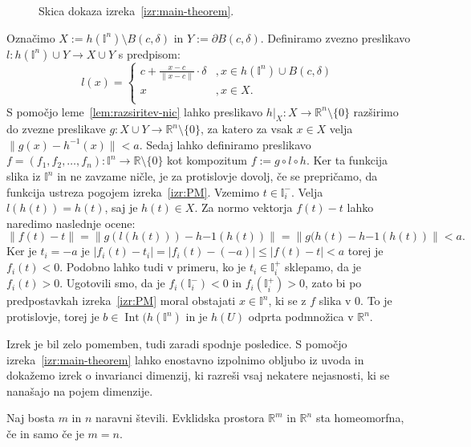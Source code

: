 \documentclass[mat1]{fmfdelo}
\newcommand{\R}{\mathbb R}
\DeclareMathOperator{\Int}{Int}
\newcommand{\I}{\mathbb I}
\newcommand{\0}{\underline{0}}
\begin{document}
\begin{dokaz}
\begin{figure}[h!]
	\caption{Skica dokaza izreka~\ref{izr:main-theorem}.}
\end{figure}

Označimo $X := h(\I^n) \setminus B(c, \delta)$ in $Y := \partial B(c, \delta)$. Definiramo zvezno preslikavo $l : h(\I^n) \cup Y \to X \cup Y$ s predpisom:
\[  l(x) = \left\{
\begin{array}{ll}
	c + \frac{x - c}{\| x - c \|} \cdot \delta &, x \in h(\I^n) \cup B(c, \delta) \\
	x &, x \in X. \\
\end{array} 
\right. \]
S pomočjo leme~\ref{lem:razsiritev-nic} lahko preslikavo $h|_X : X \to \R^n \setminus \{ 0 \}$ razširimo do zvezne preslikave $g : X \cup Y \to \R^n \setminus \{ 0 \}$, za katero za vsak $x \in X$ velja $\| g(x) - h^{-1}(x) \| < a$.
Sedaj lahko definiramo preslikavo $f = (f_1, f_2, \dots, f_n) : \I^n \to \R \setminus \{ 0 \}$ kot kompozitum $f := g \circ l \circ h$. Ker ta funkcija slika iz $\I^n$ in ne zavzame ničle, je za protislovje dovolj, če se prepričamo, da funkcija ustreza pogojem izreka~\ref{izr:PM}. Vzemimo $t \in \I_i^-$. Velja $l(h(t)) = h(t)$, saj je $h(t) \in X$. Za normo vektorja $f(t) - t$ lahko naredimo naslednje ocene:
$$\| f(t) - t \| = \| g(l(h(t))) - h{-1}(h(t)) \| = \| g(h(t) - h{-1}(h(t)) \| < a.$$ 
Ker je $t_i = - a$ je $| f_i (t) - t_i | = | f_i (t) - ( - a) | \leq | f (t) - t | < a$ torej je $f_i(t) < 0$. Podobno lahko tudi v primeru, ko je $t_i \in \I_i^+$  sklepamo, da je $f_i(t) > 0$. Ugotovili smo, da je  $f_i(\I_i^-) < 0$ in $f_i(\I_i^+) > 0$, zato bi po predpostavkah izreka~\ref{izr:PM} moral obstajati $x \in \I^n$, ki se z $f$ slika v $0$. To je protislovje, torej je $b \in \Int (h(\I^n)$ in je $h(U)$ odprta podmnožica v $\R^n$.
\end{dokaz}
Izrek je bil zelo pomemben, tudi zaradi spodnje posledice.
S pomočjo izreka~\ref{izr:main-theorem} lahko enostavno izpolnimo obljubo iz uvoda in dokažemo izrek o invarianci dimenzij, ki razreši vsaj nekatere nejasnosti, ki se nanašajo na pojem dimenzije.
\begin{posledica}\label{izr:dim_izr}
Naj bosta $m$ in $n$ naravni števili. Evklidska prostora $\R^m$ in $\R^n$ sta homeomorfna, če in samo če je $m = n$.
\end{posledica}
\end{document}
